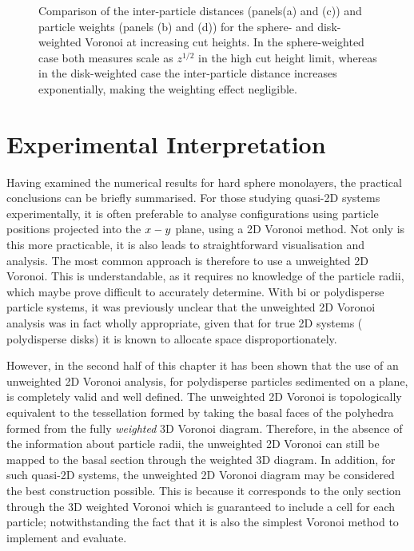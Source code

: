 \begin{figure}
	\caption{Comparison of the inter\--particle distances (panels(a) and (c)) and particle weights (panels (b) and (d)) for the sphere\-- and disk\--weighted Voronoi at increasing cut heights. In the sphere\--weighted case both measures scale as $z^{1/2}$ in the high cut height limit, whereas in the disk\--weighted case the inter\--particle distance increases exponentially, making the weighting effect negligible.}
	\label{fig:wd}
\end{figure}

\section{Experimental Interpretation}

Having examined the numerical results for \qtd{} hard sphere monolayers, the practical conclusions can be briefly summarised.
For those studying quasi\--2D systems experimentally, it is often preferable to analyse configurations using particle positions projected into the $x\--y$ plane, using a 2D Voronoi method.
Not only is this more practicable, it is also leads to straightforward visualisation and analysis.
The most common approach is therefore to use a unweighted 2D Voronoi.
This is understandable, as it requires no knowledge of the particle radii, which maybe prove difficult to accurately determine.
With bi or polydisperse particle systems, it was previously unclear that the unweighted 2D Voronoi analysis was in fact wholly appropriate, given that for true 2D systems (\eg{} polydisperse disks) it is known to allocate space disproportionately. 
 
However, in the second half of this chapter it has been shown that %
the use of an unweighted 2D Voronoi analysis, for polydisperse particles sedimented on a plane, is completely valid and well defined.
The unweighted 2D Voronoi is topologically equivalent to the tessellation formed by taking the basal faces of the polyhedra formed from the fully \textit{weighted} 3D Voronoi diagram.
Therefore, in the absence of the information about particle radii, the unweighted 2D Voronoi can still be mapped to the basal section through the weighted 3D diagram.
In addition, for such quasi\--2D systems, the unweighted 2D Voronoi diagram may be considered the best construction possible. 
This is because it corresponds to the only section through the 3D weighted Voronoi which is guaranteed to include a cell for each particle; notwithstanding the fact that it is also the simplest Voronoi method to implement and evaluate.

